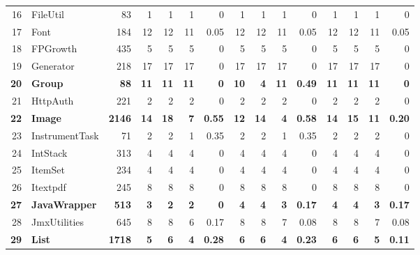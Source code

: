\documentclass{acm_proc_article-sp}
\begin{document}
\begin{table} [htp!]
{\begin{tabularx}{1 \textwidth}{r l r r r r r r r r r r r r r}
16						& FileUtil					&83			& 1		&	1	&	1	& 	0					& 1		& 1 		& 1		& 		0			& 1			& 1			& 1			&	0\\      
17						& Font					&184		&12		&	12	&	11	& 	0.05					& 12		& 12 		& 11		& 		0.05			& 12			& 12			& 11			&	0.05\\        
18						& FPGrowth				&435		& 5		&	5	&	5	& 	0					& 5		&  5		& 5		& 		0			& 5			& 5			& 5			&	0	\\       
19						& Generator				&218		& 17		&	17	&	17	& 	0					& 17		& 17 		& 17		& 		0			& 17			& 17			& 17			&	0	\\      
\textbf{20}						& \textbf{Group}					&\textbf{88}			& \textbf{11}		&	\textbf{11}	&	\textbf{11}	& 	\textbf{0}					& \textbf{10}		& \textbf{4} 		& \textbf{11}		& 		\textbf{0.49}			& \textbf{11}			& \textbf{11}			& \textbf{11}			&	\textbf{0}	\\      
21						& HttpAuth				&221		& 2		&	2	&	2	& 	0					& 2		& 2 		& 2		& 		0			& 2			& 2			& 2			&	0	\\         
\textbf{22}						& \textbf{Image}					&\textbf{2146}		& \textbf{14}		&	\textbf{18}	&	\textbf{7}	& 	\textbf{0.55}					& \textbf{12}		& \textbf{14} 		& \textbf{4}	& 		\textbf{0.58}			& \textbf{14}			& \textbf{15}			& \textbf{11}			&	\textbf{0.20}\\        
23						& InstrumentTask			&71			& 2		&	2	&	1	& 	0.35					& 2		& 2 		& 1		& 		0.35			& 2			& 2			& 2			&	0	\\    
24						& IntStack					&313		& 4		&	4	&	4	& 	0					& 4		& 4 		& 4		& 		0			& 4			& 4			& 4			&	0	\\      
25						& ItemSet					&234		& 4		&	4	&	4	& 	0					& 4		& 4 		& 4		& 		0			& 4			& 4			& 4			&	0	\\       
26						& Itextpdf					&245		& 8		&	8	&	8	& 	0					& 8		&  8		& 8		& 		0			& 8			& 8			& 8			&	0\\      
\textbf{27}						& \textbf{JavaWrapper}				&\textbf{513}		&\textbf{ 3}		&	\textbf{2}	&	\textbf{2}	& 	\textbf{0}					& \textbf{4}		& \textbf{4} 		& \textbf{3}		& 		\textbf{0.17}			& \textbf{4}			& \textbf{4}			& \textbf{3}			&	\textbf{0.17}\\      
28						& JmxUtilities				&645		& 8		&	8	&	6	& 	0.17					& 8		& 8 		& 7		& 		0.08			& 8			& 8			& 7			&	0.08\\      
\textbf{29}						& \textbf{List}					&\textbf{1718}		& \textbf{5}		&	\textbf{6}	&	\textbf{4}	& 	\textbf{0.28}					& \textbf{6}		& \textbf{6} 		& \textbf{4}		& 		\textbf{0.23}			&\textbf{6}			& \textbf{6}			& \textbf{5}			&	\textbf{0.11}\\      

\end{tabularx}}
\end{table}
\end{document}
